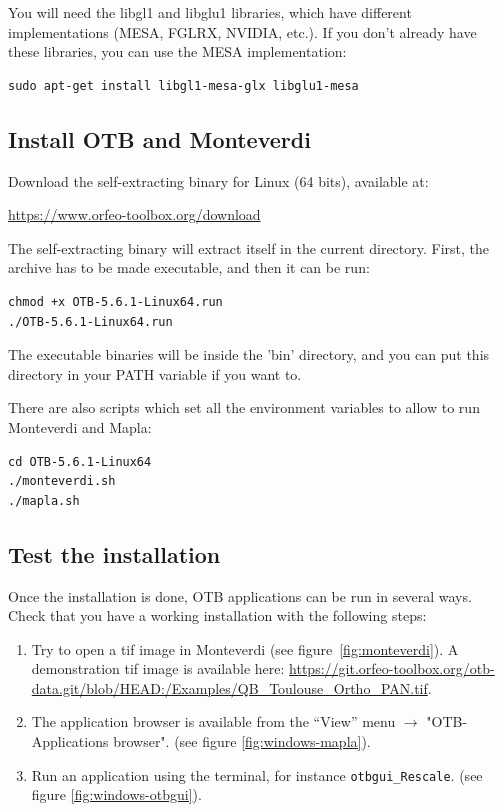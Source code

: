 \documentclass[10pt,a4paper]{article}
\begin{document}
You will need the libgl1 and libglu1 libraries, which have different implementations (MESA, FGLRX, NVIDIA, etc.). If you don't already have these libraries, you can use the MESA implementation:
\begin{verbatim}
sudo apt-get install libgl1-mesa-glx libglu1-mesa
\end{verbatim}

\subsection{Install OTB and Monteverdi}
Download the self-extracting binary for Linux (64 bits), available at:
\begin{center}
\url{https://www.orfeo-toolbox.org/download}
\end{center}

The self-extracting binary will extract itself in the current directory. First, the archive has to be made executable, and then it can be run:
\begin{verbatim}
chmod +x OTB-5.6.1-Linux64.run
./OTB-5.6.1-Linux64.run
\end{verbatim}

The executable binaries will be inside the 'bin' directory, and you can put this directory in your PATH variable if you want to. 

There are also scripts which set all the environment variables to allow to run Monteverdi and Mapla:
\begin{verbatim}
cd OTB-5.6.1-Linux64
./monteverdi.sh
./mapla.sh
\end{verbatim}

\subsection{Test the installation}
Once the installation is done, OTB applications can be run in several ways. Check that you have a working installation with the following steps:
\begin{enumerate}

\item Try to open a tif image in Monteverdi (see
figure~\ref{fig:monteverdi}). A demonstration tif image is available here: \url{https://git.orfeo-toolbox.org/otb-data.git/blob/HEAD:/Examples/QB\_Toulouse\_Ortho\_PAN.tif}.

\item The application browser is available from the ``View'' menu 
$\rightarrow$ "OTB-Applications browser".
(see figure \ref{fig:windows-mapla}).

\item Run an application using the terminal, for instance
\texttt{otbgui\_Rescale}. (see figure \ref{fig:windows-otbgui}).

\end{enumerate}
\end{document}
